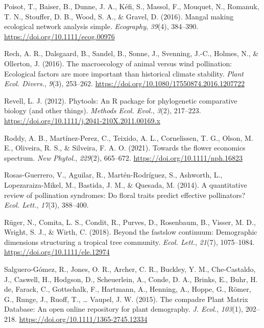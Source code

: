 \documentclass[
  12pt,
  a4paper,
]{article}
\newlength{\cslhangindent}
\newlength{\cslentryspacingunit} %
\newenvironment{CSLReferences}[2] %
 {%
  \setlength{\parindent}{0pt}
  \ifodd #1
  \let\oldpar\par
  \def\par{\hangindent=\cslhangindent\oldpar}
  \fi
  \setlength{\parskip}{#2\cslentryspacingunit}
 }%
 {}
\begin{document}
\begin{CSLReferences}{1}{0}
\leavevmode{}%
Poisot, T., Baiser, B., Dunne, J. A., Kéfi, S., Massol, F., Mouquet, N., Romanuk, T. N., Stouffer, D. B., Wood, S. A., \& Gravel, D. (2016). Mangal \textendash{} making ecological network analysis simple. \emph{Ecography}, \emph{39}(4), 384--390. \url{https://doi.org/10.1111/ecog.00976}

\leavevmode{}%
Rech, A. R., Dalsgaard, B., Sandel, B., Sonne, J., Svenning, J.-C., Holmes, N., \& Ollerton, J. (2016). The macroecology of animal versus wind pollination: Ecological factors are more important than historical climate stability. \emph{Plant Ecol. Divers.}, \emph{9}(3), 253--262. \url{https://doi.org/10.1080/17550874.2016.1207722}

\leavevmode{}%
Revell, L. J. (2012). Phytools: An {R} package for phylogenetic comparative biology (and other things). \emph{Methods Ecol. Evol.}, \emph{3}(2), 217--223. \url{https://doi.org/10.1111/j.2041-210X.2011.00169.x}

\leavevmode{}%
Roddy, A. B., Martínez-Perez, C., Teixido, A. L., Cornelissen, T. G., Olson, M. E., Oliveira, R. S., \& Silveira, F. A. O. (2021). Towards the flower economics spectrum. \emph{New Phytol.}, \emph{229}(2), 665--672. \url{https://doi.org/10.1111/nph.16823}

\leavevmode{}%
Rosas-Guerrero, V., Aguilar, R., Martén-Rodríguez, S., Ashworth, L., Lopezaraiza-Mikel, M., Bastida, J. M., \& Quesada, M. (2014). A quantitative review of pollination syndromes: Do floral traits predict effective pollinators? \emph{Ecol. Lett.}, \emph{17}(3), 388--400.

\leavevmode{}%
Rüger, N., Comita, L. S., Condit, R., Purves, D., Rosenbaum, B., Visser, M. D., Wright, S. J., \& Wirth, C. (2018). Beyond the fast\textendash slow continuum: Demographic dimensions structuring a tropical tree community. \emph{Ecol. Lett.}, \emph{21}(7), 1075--1084. \url{https://doi.org/10.1111/ele.12974}

\leavevmode{}%
Salguero-Gómez, R., Jones, O. R., Archer, C. R., Buckley, Y. M., Che-Castaldo, J., Caswell, H., Hodgson, D., Scheuerlein, A., Conde, D. A., Brinks, E., Buhr, H. de, Farack, C., Gottschalk, F., Hartmann, A., Henning, A., Hoppe, G., Römer, G., Runge, J., Ruoff, T., \ldots{} Vaupel, J. W. (2015). The compadre {Plant Matrix Database}: An open online repository for plant demography. \emph{J. Ecol.}, \emph{103}(1), 202--218. \url{https://doi.org/10.1111/1365-2745.12334}


\end{CSLReferences}
\end{document}
